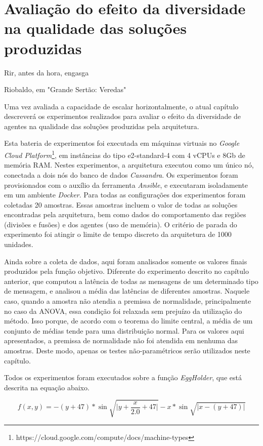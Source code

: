 \chapter{Avaliação do efeito da diversidade na qualidade das soluções produzidas}
\label{chap:exp_diversidade}
\epigraph{Rir, antes da hora, engasga}{Riobaldo, em "Grande Sertão: Veredas"}

Uma vez avaliada a capacidade de escalar horizontalmente, o atual capítulo descreverá os experimentos realizados para avaliar o efeito da diversidade de agentes na qualidade das soluções produzidas pela arquitetura.

Esta bateria de experimentos foi executada em máquinas virtuais no \textit{Google Cloud Platform}\footnote{https://cloud.google.com/compute/docs/machine-types}, em instâncias do tipo e2-standard-4 com 4 vCPUs e 8Gb de memória RAM. Nestes experimentos, a arquitetura executou como um único nó, conectada a dois nós do banco de dados \textit{Cassandra}. Os experimentos foram provisionados com o auxílio da ferramenta \textit{Ansible}, e executaram isoladamente em um ambiente \textit{Docker}. Para todas as configurações dos experimentos foram coletadas 20 amostras. Essas amostras incluem o valor de todas as soluções encontradas pela arquitetura, bem como dados do comportamento das regiões (divisões e fusões) e dos agentes (uso de memória). O critério de parada do experimento foi atingir o limite de tempo discreto da arquitetura de 1000 unidades.

Ainda sobre a coleta de dados, aqui foram analisados somente os valores finais produzidos pela função objetivo. Diferente do experimento descrito no capítulo anterior, que computou a latência de todas as mensagens de um determinado tipo de mensagem, e analisou a média das latências de diferentes amostras. Naquele caso, quando a amostra não atendia a premissa de normalidade, principalmente no caso da ANOVA, essa condição foi relaxada sem prejuízo da utilização do método. Isso porque, de acordo com o teorema do limite central, a média de um conjunto de médias tende para uma distribuição normal.  Para os valores aqui apresentados, a premissa de normalidade não foi atendida em nenhuma das amostras. Deste modo, apenas os testes não-paramétricos serão utilizados neste capítulo. 

Todos os experimentos foram executados sobre a função \textit{EggHolder}, que está descrita na equação abaixo. 

\begin{equation*}
  f(x, y) = -(y + 47) * \sin{\sqrt{\big| y + \frac{x}{2.0} + 47 \big| }} - x * \sin{\sqrt{\big|x - (y + 47)\big|}} 
\end{equation*}

